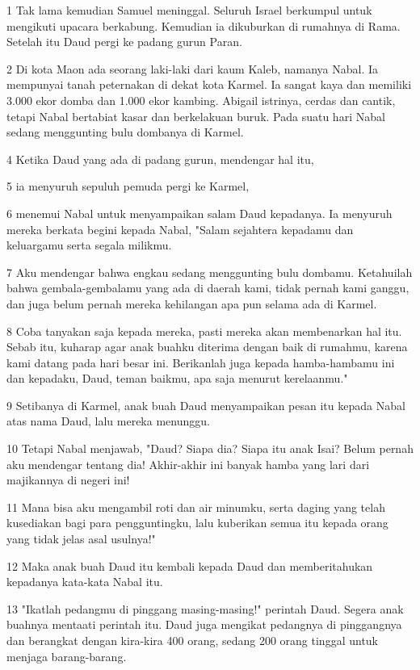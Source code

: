 \par 1 Tak lama kemudian Samuel meninggal. Seluruh Israel berkumpul untuk mengikuti upacara berkabung. Kemudian ia dikuburkan di rumahnya di Rama. Setelah itu Daud pergi ke padang gurun Paran.
\par 2 Di kota Maon ada seorang laki-laki dari kaum Kaleb, namanya Nabal. Ia mempunyai tanah peternakan di dekat kota Karmel. Ia sangat kaya dan memiliki 3.000 ekor domba dan 1.000 ekor kambing. Abigail istrinya, cerdas dan cantik, tetapi Nabal bertabiat kasar dan berkelakuan buruk. Pada suatu hari Nabal sedang menggunting bulu dombanya di Karmel.
\par 4 Ketika Daud yang ada di padang gurun, mendengar hal itu,
\par 5 ia menyuruh sepuluh pemuda pergi ke Karmel,
\par 6 menemui Nabal untuk menyampaikan salam Daud kepadanya. Ia menyuruh mereka berkata begini kepada Nabal, "Salam sejahtera kepadamu dan keluargamu serta segala milikmu.
\par 7 Aku mendengar bahwa engkau sedang menggunting bulu dombamu. Ketahuilah bahwa gembala-gembalamu yang ada di daerah kami, tidak pernah kami ganggu, dan juga belum pernah mereka kehilangan apa pun selama ada di Karmel.
\par 8 Coba tanyakan saja kepada mereka, pasti mereka akan membenarkan hal itu. Sebab itu, kuharap agar anak buahku diterima dengan baik di rumahmu, karena kami datang pada hari besar ini. Berikanlah juga kepada hamba-hambamu ini dan kepadaku, Daud, teman baikmu, apa saja menurut kerelaanmu."
\par 9 Setibanya di Karmel, anak buah Daud menyampaikan pesan itu kepada Nabal atas nama Daud, lalu mereka menunggu.
\par 10 Tetapi Nabal menjawab, "Daud? Siapa dia? Siapa itu anak Isai? Belum pernah aku mendengar tentang dia! Akhir-akhir ini banyak hamba yang lari dari majikannya di negeri ini!
\par 11 Mana bisa aku mengambil roti dan air minumku, serta daging yang telah kusediakan bagi para pengguntingku, lalu kuberikan semua itu kepada orang yang tidak jelas asal usulnya!"
\par 12 Maka anak buah Daud itu kembali kepada Daud dan memberitahukan kepadanya kata-kata Nabal itu.
\par 13 "Ikatlah pedangmu di pinggang masing-masing!" perintah Daud. Segera anak buahnya mentaati perintah itu. Daud juga mengikat pedangnya di pinggangnya dan berangkat dengan kira-kira 400 orang, sedang 200 orang tinggal untuk menjaga barang-barang.
